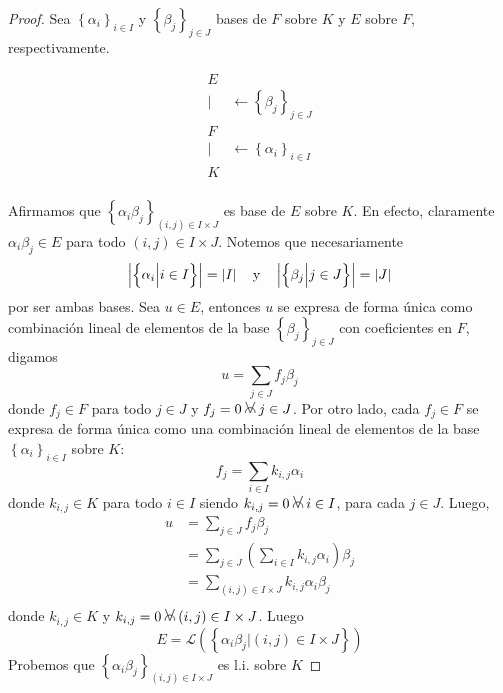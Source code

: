 \documentclass[12pt]{report}
\theoremstyle{largebreak}
\newcommand\abs[1]{\ensuremath{\left|#1\right|}}
\newcommand{\afa}{\:
    \begin{tikzpicture}
        \draw [line width = 0.17 mm, black] (0,0) -- (-0.115,0.29);
        \draw [line width = 0.17 mm, black] (0,0) -- (0.115,0.29);
        \draw [line width = 0.17 mm, black] (-0.12,0) arc (190:-10:0.12cm);
    \end{tikzpicture}
    \:
}
\begin{document}
    \begin{proof}
        Sea $\left\{\alpha_i \right\}_{ i\in I}$ y $\left\{\beta_j \right\}_{ j\in J}$ bases de $F$ sobre $K$ y $E$ sobre $F$, respectivamente.

        \begin{equation*}
            \begin{split}
                E & \\
                | & \leftarrow \left\{\beta_j \right\}_{ j\in J} \\
                F & \\
                | & \leftarrow \left\{\alpha_i \right\}_{ i\in I}\\
                K & \\
            \end{split}
        \end{equation*}
        
        Afirmamos que $\left\{\alpha_i\beta_j \right\}_{ (i,j)\in I\times J}$ es base de $E$ sobre $K$. En efecto, claramente $\alpha_i\beta_j\in E$ para todo $(i,j)\in I\times J$. Notemos que necesariamente
        \begin{equation*}
            \abs{\left\{\alpha_i\Big|i\in I \right\}}=\abs{I}\quad\textup{y}\quad\abs{\left\{\beta_j\Big|j\in J \right\}}=\abs{J}
        \end{equation*}
        por ser ambas bases. Sea $u\in E$, entonces $u$ se expresa de forma única como combinación lineal de elementos de la base $\left\{\beta_j \right\}_{ j\in J}$ con coeficientes en $F$, digamos
        \begin{equation*}
            u=\sum_{j\in J}f_j\beta_j
        \end{equation*}
        donde $f_j\in F$ para todo $j\in J$ y $f_j=0\afa j\in J$. Por otro lado, cada $f_j\in F$ se expresa de forma única como una combinación lineal de elementos de la base $\left\{\alpha_i\right\}_{ i\in I}$ sobre $K$:
        \begin{equation*}
            f_j=\sum_{ i\in I}k_{ i,j}\alpha_i
        \end{equation*}
        donde $k_{ i,j}\in K$ para todo $i\in I$ siendo $k_{ i,j}=0\afa i\in I$, para cada $j\in J$. Luego,
        \begin{equation*}
            \begin{split}
                u&=\sum_{j\in J}f_j\beta_j\\
                &=\sum_{j\in J}\left( \sum_{ i\in I}k_{ i,j}\alpha_i \right) \beta_j\\
                &=\sum_{(i,j)\in I\times J}k_{ i,j}\alpha_i\beta_j\\
            \end{split}
        \end{equation*}
        donde $k_{ i,j}\in K$ y $k_{ i,j}=0\afa (i,j)\in I\times J$. Luego
        \begin{equation*}
            E=\mathcal{L}\left(\left\{\alpha_i\beta_j\Big|(i,j)\in I\times J \right\} \right)
        \end{equation*}
        Probemos que $\left\{\alpha_i\beta_j \right\}_{ (i,j)\in I\times J}$ es l.i. sobre $K$
    \end{proof}
\end{document}
